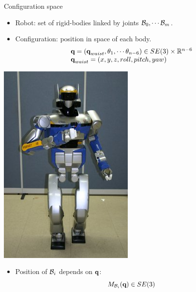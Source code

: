 \begin{frame} {Configuration space}
  \parbox{.71\linewidth} {
  \begin{itemize}
    \item Robot: set of rigid-bodies linked by joints ${\cal B}_0,\cdots{\cal B}_m$.
      \pause
    \item Configuration: position in space of each body.
      $$
      \begin{array}{l}
        \textbf{q} = (\textbf{q}_{waist}, \theta_1, \cdots \theta_{n-6}) \in SE(3) \times \mathbb{R}^{n-6}\\
        \textbf{q}_{waist} = (x, y, z, roll, pitch, yaw)
      \end{array}
      $$
  \end{itemize}
  }
  \parbox {.28\linewidth} {
    \centerline {
      \includegraphics[width=\linewidth]{figures/hrp2}
    }
  }
  \pause
  \begin{itemize}
  \item Position of ${\cal B}_i$ depends on $\textbf{q}$:
    $$M_{{\cal B}_i} (\textbf{q}) \in SE(3)$$
    
  \end{itemize}
\end{frame}

